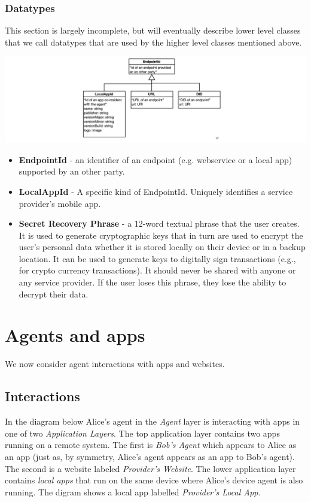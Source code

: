 \documentclass[11pt, oneside]{article}   	%
\begin{document}
\subsubsection{Datatypes}

This section is largely incomplete, but will eventually describe lower level classes that we call datatypes that are used by the higher level classes mentioned above.

\includegraphics[width=\textwidth]{./images/datatypes.png}

\begin{itemize}
\item \textbf{EndpointId} -  an identifier of an endpoint (e.g. webservice or a local app) supported by an other party.
\item \textbf{LocalAppId} - A specific kind of EndpointId. Uniquely identifies a service provider's mobile app. 
\item \textbf{Secret Recovery Phrase} - a 12-word textual phrase that the user creates. It is used to generate cryptographic keys that in turn are used to encrypt the user’s personal data whether it is stored locally on their device or in a backup location. It can be used to generate keys to digitally sign transactions (e.g., for crypto currency transactions). It should never be shared with anyone or any service provider. If the user loses this phrase, they lose the ability to decrypt their data. 
\end{itemize}

\section{Agents and apps} %

We now consider agent interactions with apps and websites. 

\subsection{Interactions}

In the diagram below Alice's agent in the \emph{Agent} layer is interacting with apps in one of two \emph{Application Layers}. The top application layer contains two apps running on a remote system. The first is \emph{Bob's Agent} which appears to Alice as an app (just as, by symmetry, Alice's agent appears as an app to Bob's agent). The second is a website labeled \emph{Provider's Website}. The lower application layer contains \emph{local apps} that run on the same device where Alice's device agent is also running. The digram shows a local app labelled \emph{Provider's Local App}.
\end{document}

